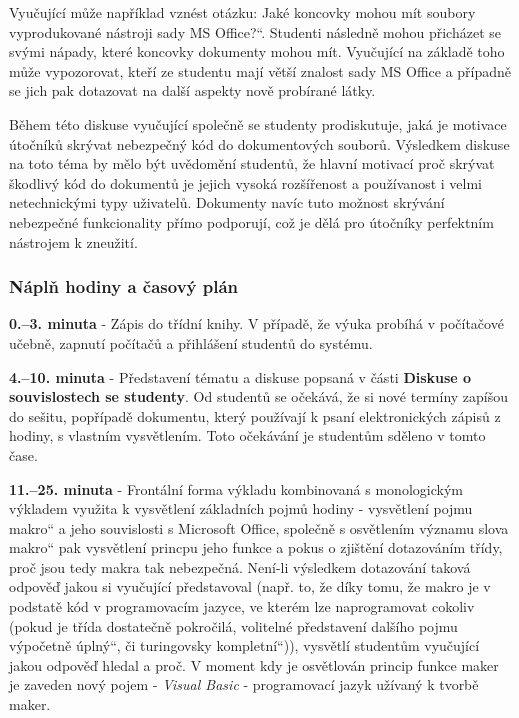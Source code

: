 \documentclass[a4paper, 12pt]{article}
\providecommand{\uv}[1]{\quotedblbase #1\textquotedblleft}
\begin{document}
Vyučující může například vznést otázku: \uv{Jaké koncovky mohou mít soubory vyprodukované nástroji sady MS Office?}. Studenti následně mohou přicházet se svými nápady, které koncovky dokumenty mohou mít. Vyučující na základě toho může vypozorovat, kteří ze studentu mají větší znalost sady MS Office a případně se jich pak dotazovat na další aspekty nově probírané látky. 

Během této diskuse vyučující společně se studenty prodiskutuje, jaká je motivace útočníků skrývat nebezpečný kód do dokumentových souborů. Výsledkem diskuse na toto téma by mělo být uvědomění studentů, že hlavní motivací proč skrývat škodlivý kód do dokumentů je jejich vysoká rozšířenost a používanost i velmi netechnickými typy uživatelů. Dokumenty navíc tuto možnost skrývání nebezpečné funkcionality přímo podporují, což je dělá pro útočníky perfektním nástrojem k zneužití.

\subsubsection{Náplň hodiny a časový plán}
\indent\textbf{0.--3. minuta} - Zápis do třídní knihy. V případě, že výuka probíhá v počítačové učebně, zapnutí počítačů a přihlášení studentů do systému.

\textbf{4.--10. minuta} - Představení tématu a diskuse popsaná v části \textbf{Diskuse o souvislostech se studenty}. Od studentů se očekává, že si nové termíny zapíšou do sešitu, popřípadě dokumentu, který používají k psaní elektronických zápisů z hodiny, s vlastním vysvětlením. Toto očekávání je studentům sděleno v tomto čase.

\textbf{11.--25. minuta} - Frontální forma výkladu kombinovaná s monologickým výkladem využita k vysvětlení základních pojmů hodiny - vysvětlení pojmu \uv{makro} a jeho souvislosti s Microsoft Office, společně s osvětlením významu slova \uv{makro} pak vysvětlení princpu jeho funkce a pokus o zjištění dotazováním třídy, proč jsou tedy makra tak nebezpečná. Není-li výsledkem dotazování taková odpověď jakou si vyučující představoval (např. to, že díky tomu, že makro je v podstatě kód v programovacím jazyce, ve kterém lze naprogramovat cokoliv (pokud je třída dostatečně pokročilá, volitelné představení dalšího pojmu \uv{výpočetně úplný}, či \uv{turingovsky kompletní})), vysvětlí studentům vyučující jakou odpověď hledal a proč. V moment kdy je osvětlován princip funkce maker je zaveden nový pojem - \textit{Visual Basic} - programovací jazyk užívaný k tvorbě maker.
\end{document}
